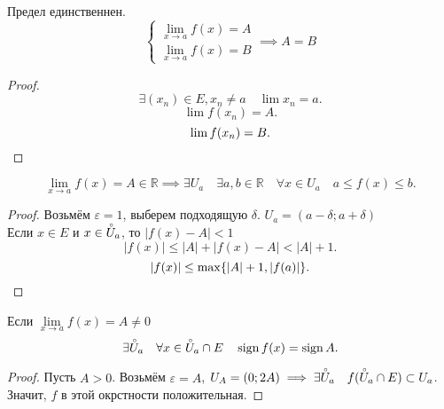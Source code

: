 \documentclass[11pt, oneside]{article}   	%
\DeclareMathOperator{\sign}{sign}
\begin{document}
        \begin{dlemma}
            Предел единственнен.
            \begin{equation*}
                \begin{cases}
                    \lim\limits_{x \to a} f(x) = A\\
                    \lim\limits_{x \to a} f(x) = B
                \end{cases}
                \implies A = B
            \end{equation*}
            \begin{proof}
                \[ \exists{(x_n)\in E, x_n \neq a}\quad \lim x_n = a .\] 
                \[ \lim f(x_n) = A .\]
                \[ \lim f(x_n) = B .\qedhere\] 
            \end{proof}
        \end{dlemma}
        \begin{dlemma} 
            \[\lim\limits_{x \to a} f(x) = A\in \mathbb{R} \implies  \exists{U_a}\quad \exists{a, b\in \mathbb{R}}\quad  \forall{x\in U_a}\quad a \le f(x) \le b  .\]
            \begin{proof}
                Возьмём $\varepsilon=1$, выберем подходящую $\delta$.  $U_a = \left( a-\delta; a+\delta \right) $ \\
                Если $x\in E$ и $x\in \accentset{\circ}{U}_a$, то $|f(x) - A| < 1$\\
                \[ |f(x)| \le |A| + |f(x)-A| < |A|+1.\]
                \[ |f(x)| \le\max \{|A|+1, |f(a)|\}  .\qedhere\] 
            \end{proof}
        \end{dlemma}
        \begin{dlemma}
            Если $\lim\limits_{x \to a} f(x) = A \neq 0$
            \[ \exists{\accentset{\circ}{U}_a}\quad \forall{x\in \accentset{\circ}{U}_a\cap E}\quad \sign{f(x)}=\sign{A} .\]
            \begin{proof}
                Пусть $A>0$. Возьмём $\varepsilon=A$, $U_A = \left( 0; 2A \right) \implies \exists{\accentset{\circ}{U}_a}\quad f(\accentset{\circ}{U}_a\cap E) \subset U_a$.
                Значит, $f$ в этой окрстности положительная.
            \end{proof}
        \end{dlemma}
\end{document}

